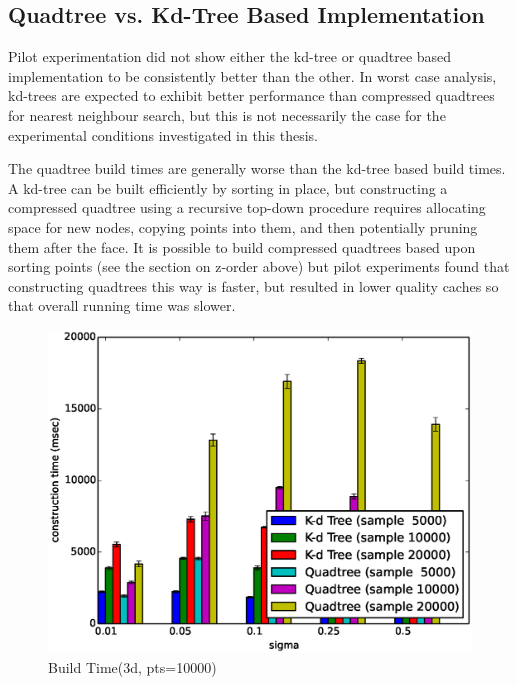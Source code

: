 \documentclass[mcs]{scsthesis}
\begin{document}
\subsection{Quadtree vs. Kd-Tree Based Implementation}

Pilot experimentation did not show either the kd-tree or quadtree based
implementation to be consistently better than the other. In worst case analysis,
kd-trees are expected to exhibit better performance than compressed quadtrees
for nearest neighbour search, but this is not necessarily the case for the
experimental conditions investigated in this thesis.

The quadtree build times are generally worse than the kd-tree based build times.
A kd-tree can be built efficiently by sorting in place, but constructing a
compressed quadtree using a recursive top-down procedure requires allocating
space for new nodes, copying points into them, and then potentially pruning them
after the face. It is possible to build compressed quadtrees based upon sorting
points (see the section on z-order above) but pilot experiments found that
constructing quadtrees this way is faster, but resulted in lower quality caches
so that overall running time was slower.

\begin{figure}
\begin{center}
\includegraphics[scale=0.5]{diagrams/3d_qt_kt_pts10000_ctime.eps}
\caption{Build Time(3d, pts=10000)}
\label{fig:3d_kd_qt_ctime}
\end{center}
\end{figure}
\end{document}
